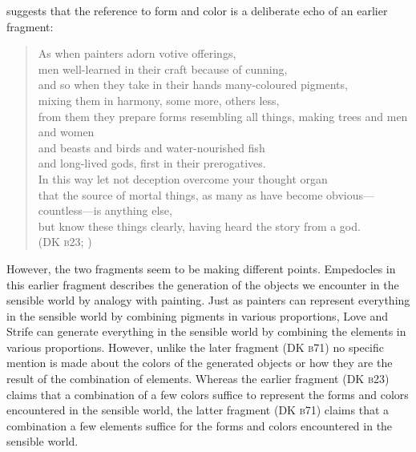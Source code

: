\citet[222]{Wright:1981zr} suggests that the reference to form and color is a deliberate echo of an earlier fragment:
\begin{verse}
    As when painters adorn votive offerings,\\
    men well-learned in their craft because of cunning,\\
    and so when they take in their hands many-coloured pigments,\\
    mixing them in harmony, some more, others less,\\
    from them they prepare forms resembling all things,
    making trees and men and women\\
    and beasts and birds and water-nourished fish\\
    and long-lived gods, first in their prerogatives.\\
    In this way let not deception overcome your thought organ\\
    that the source of mortal things, as many as have become obvious---countless---is anything else,\\
    but know these things clearly, having heard the story from a god.\\ 
    (DK \textsc{b}23; \citealt[27 231]{Inwood:2001ve})
\end{verse}
However, the two fragments seem to be making different points. Empedocles in this earlier fragment describes the generation of the objects we encounter in the sensible world by analogy with painting. Just as painters can represent everything in the sensible world by combining pigments in various proportions, Love and Strife can generate everything in the sensible world by combining the elements in various proportions. However, unlike the later fragment (DK \textsc{b}71) no specific mention is made about the colors of the generated objects or how they are the result of the combination of elements. Whereas the earlier fragment (DK \textsc{b}23) claims that a combination of a few colors suffice to represent the forms and colors encountered in the sensible world, the latter fragment (DK \textsc{b}71) claims that a combination a few elements suffice for the forms and colors encountered in the sensible world.


